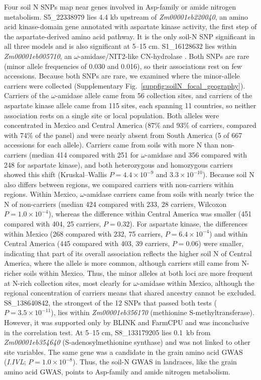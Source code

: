 Four soil N SNPs map near genes involved in Asp-family or amide nitrogen metabolism. S5\_22338979 lies 4.4 kb upstream of \textit{Zm00001eb220040}, an amino acid kinase-domain gene annotated with aspartate kinase activity, the first step of the aspartate-derived amino acid pathway. It is the only soil-N SNP significant in all three models and is also significant at 5--15 cm. S1\_16128632 lies within \textit{Zm00001eb005710}, an $\omega$-amidase/NIT2-like CN-hydrolase \citep{Zhang2014OmegaAmidase}. Both SNPs are rare (minor allele frequencies of 0.030 and 0.016), so their associations rest on few accessions. Because both SNPs are rare, we examined where the minor-allele carriers were collected (Supplementary Fig.~\ref{suppfig:soilN_focal_geography}). Carriers of the $\omega$-amidase allele came from 56 collection sites, and carriers of the aspartate kinase allele came from 115 sites, each spanning 11 countries, so neither association rests on a single site or local population. Both alleles were concentrated in Mexico and Central America (87\% and 93\% of carriers, compared with 74\% of the panel) and were nearly absent from South America (5 of 667 accessions for each allele). Carriers came from soils with more N than non-carriers (median 414 compared with 251 for $\omega$-amidase and 356 compared with 248 for aspartate kinase), and both heterozygous and homozygous carriers showed this shift (Kruskal--Wallis $P = 4.4 \times 10^{-9}$ and $3.3 \times 10^{-10}$). Because soil N also differs between regions, we compared carriers with non-carriers within regions. Within Mexico, $\omega$-amidase carriers came from soils with nearly twice the N of non-carriers (median 424 compared with 233, 28 carriers, Wilcoxon $P = 1.0 \times 10^{-4}$), whereas the difference within Central America was smaller (451 compared with 404, 25 carriers, $P = 0.32$). For aspartate kinase, the differences within Mexico (268 compared with 232, 75 carriers, $P = 6.4 \times 10^{-4}$) and within Central America (445 compared with 403, 39 carriers, $P = 0.06$) were smaller, indicating that part of its overall association reflects the higher soil N of Central America, where the allele is more common, although carriers still came from N-richer soils within Mexico. Thus, the minor alleles at both loci are more frequent at N-rich collection sites, most clearly for $\omega$-amidase within Mexico, although the regional concentration of carriers means that shared ancestry cannot be excluded. S8\_138640842, the strongest of the 12 SNPs that passed both tests ($P = 3.5\times10^{-11}$), lies within \textit{Zm00001eb356170} (methionine S-methyltransferase). However, it was supported only by BLINK and FarmCPU and was inconclusive in the correlation test. At 5--15 cm, S8\_133179205 lies 0.1~kb from \textit{Zm00001eb354640} (S-adenosylmethionine synthase) and was not linked to other site variables. The same gene was a candidate in the grain amino acid GWAS (\textit{I.IVL}; $P = 1.0 \times 10^{-8}$). Thus, the soil-N GWAS in landraces, like the grain amino acid GWAS, points to Asp-family and amide nitrogen metabolism.

